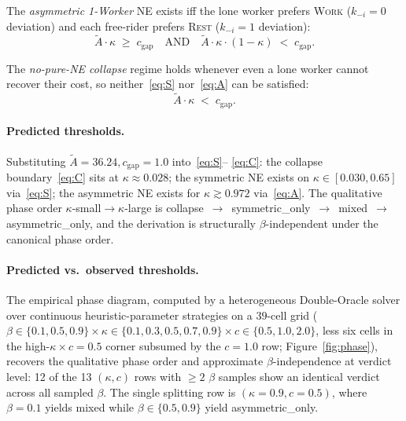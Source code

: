\documentclass{anvil-paper}
\begin{document}
The \emph{asymmetric 1-Worker} NE exists iff the lone worker prefers
\textsc{Work} ($k_{-i}{=}0$ deviation) and each free-rider prefers
\textsc{Rest} ($k_{-i}{=}1$ deviation):
\begin{equation}
  \tilde A\cdot\kappa\;\geq\;c_{\text{gap}}
  \quad\text{AND}\quad
  \tilde A\cdot\kappa\cdot(1-\kappa)\;<\;c_{\text{gap}}.
  \tag{A}\label{eq:A}
\end{equation}

The \emph{no-pure-NE collapse} regime holds whenever even a lone worker
cannot recover their cost, so neither~\eqref{eq:S} nor~\eqref{eq:A} can be
satisfied:
\begin{equation}
  \tilde A\cdot\kappa\;<\;c_{\text{gap}}.
  \tag{C}\label{eq:C}
\end{equation}

\paragraph{Predicted thresholds.}
Substituting $\tilde A{=}36.24,c_{\text{gap}}{=}1.0$ into~\eqref{eq:S}--%
\eqref{eq:C}: the collapse boundary~\eqref{eq:C} sits at
$\kappa\approx 0.028$; the symmetric NE exists on
$\kappa\in[0.030,0.65]$ via~\eqref{eq:S}; the asymmetric NE exists for
$\kappa\gtrsim 0.972$ via~\eqref{eq:A}. The qualitative phase order
$\kappa$-small$\to$$\kappa$-large is
\textsf{collapse}~$\to$~\textsf{symmetric\_only}~$\to$~\textsf{mixed}~$\to$~%
\textsf{asymmetric\_only}, and the derivation is structurally
$\beta$-independent under the canonical phase order.

\paragraph{Predicted vs.\ observed thresholds.}
The empirical phase diagram, computed by a heterogeneous Double-Oracle
solver over continuous heuristic-parameter strategies on a $39$-cell grid
($\beta\in\{0.1,0.5,0.9\}\times\kappa\in\{0.1,0.3,0.5,0.7,0.9\}\times
c\in\{0.5,1.0,2.0\}$, less six cells in the high-$\kappa\times c{=}0.5$
corner subsumed by the $c{=}1.0$ row; Figure~\ref{fig:phase}), recovers the
qualitative phase order and approximate $\beta$-independence at verdict
level: 12 of the 13 $(\kappa,c)$ rows with $\geq 2$ $\beta$ samples
show an identical verdict across all sampled $\beta$. The single
splitting row is $(\kappa{=}0.9, c{=}0.5)$, where $\beta{=}0.1$
yields \textsf{mixed} while $\beta\in\{0.5, 0.9\}$ yield
\textsf{asymmetric\_only}.
\end{document}
